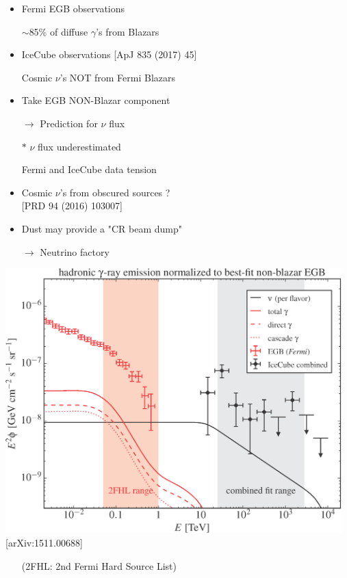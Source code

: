 \Tr
\twocolumn
\begin{itemize}
\item Fermi EGB observations
\item[] {\blue $\sim$85\% of diffuse $\gamma$'s from Blazars}
\item IceCube observations {\large [ApJ 835 (2017) 45]}
\item[] {\blue Cosmic $\nu$'s NOT from Fermi Blazars}
\item Take EGB NON-Blazar component
\item[] $\rightarrow$ {\blue Prediction for $\nu$ flux}
\end{itemize}
%
\begin{itemize}
\item[$\ast$] {\red $\nu$ flux underestimated}
\item[] Fermi and IceCube data tension
\item {\red Cosmic $\nu$'s from obscured sources ?}\\
      {\large [PRD 94 (2016) 103007]}
\item Dust may provide a "CR beam dump"
\item[] $\rightarrow$ Neutrino factory
\end{itemize}

\newpage
%
\begin{center}
\includegraphics[keepaspectratio,width=13cm]{Fermi-IC}\\
{\large [arXiv:1511.00688]}
\end{center}
\begin{itemize}
\item[] (2FHL: 2nd Fermi Hard Source List)
\end{itemize}
